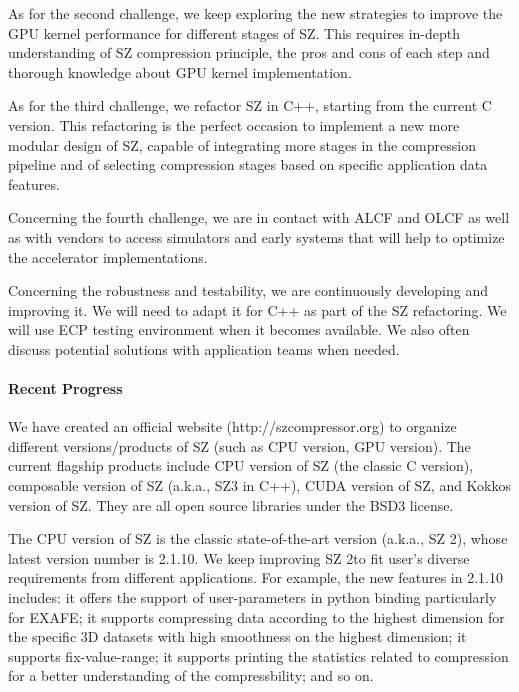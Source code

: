 As for the second challenge, we keep exploring the new strategies to improve the GPU kernel performance for different stages of SZ. This requires in-depth understanding of SZ compression principle, the pros and cons of each step and thorough knowledge about GPU kernel implementation.  

As for the third challenge, we refactor SZ in C++, starting from the current C version. This refactoring is the perfect occasion to implement a new more modular design of SZ, capable of integrating more stages in the compression pipeline and of selecting compression stages based on specific application data features.

Concerning the fourth challenge, we are in contact with ALCF and OLCF as well as with vendors to access simulators and early systems that will help to optimize the accelerator implementations.

Concerning the robustness and testability, we are continuously developing and improving it. We will need to adapt it for C++ as part of the SZ refactoring. We will use ECP testing environment when it becomes available. We also often discuss potential solutions with application teams when needed. 


\paragraph{Recent Progress}

We have created an official website (http://szcompressor.org) to organize different versions/products of SZ (such as CPU version, GPU version). The current flagship products include CPU version of SZ (the classic C version), composable version of SZ (a.k.a., SZ3 in C++), CUDA version of SZ, and Kokkos version of SZ. They are all open source libraries under the BSD3 license.

The CPU version of SZ is the classic state-of-the-art version (a.k.a., SZ 2), whose latest version number is 2.1.10. We keep improving SZ 2to fit user's diverse requirements from different applications. For example, the new features in 2.1.10 includes: it offers the support of user-parameters in python binding particularly for EXAFE; it supports compressing data according to the highest dimension for the specific 3D datasets with high smoothness on the highest dimension; it supports fix-value-range; it supports printing the statistics related to compression for a better understanding of the compressbility; and so on. %

